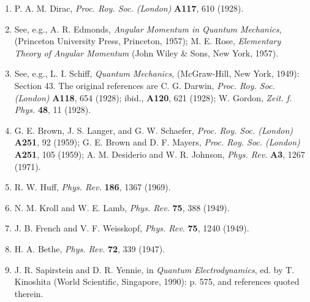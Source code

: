 


\begin{enumerate}
\item \hypertarget{ref:14.1}{}P. A. M. Dirac, \emph{Proc. Roy. Soc.
(London)} \textbf{A117}, 610 (1928).

\item \hypertarget{ref:14.2}{}See, e.g., A. R. Edmonds, \emph{Angular
Momentum in Quantum Mechanics}, (Princeton University Press, Princeton,
1957); M. E. Rose, \emph{Elementary Theory of Angular Momentum} (John Wiley
\& Sons, New York, 1957).

\item \hypertarget{ref:14.3}{}See, e.g., L. I. Schiff, \emph{Quantum
Mechanics}, (McGraw-Hill, New York, 1949): Section 43. The original references
are C. G. Darwin, \emph{Proc. Roy. Soc. (London)} \textbf{A118}, 654 (1928);
ibid., \textbf{A120}, 621 (1928); W. Gordon, \emph{Zeit. f. Phys.} \textbf{48},
11 (1928).

\item \hypertarget{ref:14.4}{}G. E. Brown, J. S. Langer, and G. W. Schaefer,
\emph{Proc. Roy. Soc. (London)} \textbf{A251}, 92 (1959); G. E. Brown and
D. F. Mayers, \emph{Proc. Roy. Soc. (London)} \textbf{A251}, 105 (1959);
A. M. Desiderio and W. R. Johnson, \emph{Phys. Rev.} \textbf{A3}, 1267
(1971).

\item \hypertarget{ref:14.5}{}R. W. Huff, \emph{Phys. Rev.} \textbf{186},
1367 (1969).

\item \hypertarget{ref:14.6}{}N. M. Kroll and W. E. Lamb, \emph{Phys. Rev.}
\textbf{75}, 388 (1949).

\item \hypertarget{ref:14.7}{}J. B. French and V. F. Weisskopf,
\emph{Phys. Rev.} \textbf{75}, 1240 (1949).

\item \hypertarget{ref:14.8}{}H. A. Bethe, \emph{Phys. Rev.} \textbf{72},
339 (1947).

\item \hypertarget{ref:14.9}{}J. R. Sapirstein and D. R. Yennie, in
\emph{Quantum Electrodynamics}, ed. by T. Kinoshita (World Scientific,
Singapore, 1990): p. 575, and references quoted therein.


\end{enumerate}
